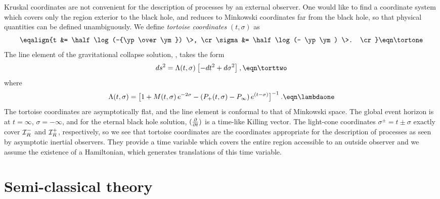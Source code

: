 Kruskal coordinates are not convenient for the description of
processes by an external observer.  One would like to find a
coordinate system which covers only the region exterior to the black
hole, and reduces to Minkowski coordinates far from the black hole,
so that physical quantities can be defined unambiguously.  We define
{\it tortoise coordinates\/} $(t,\sigma)$ as
$$
\eqalign{t &= \half \log (-{\yp\over \ym}) \>, \cr
\sigma &= \half \log (- \yp \ym) \>. \cr}
\eqn\tortone
$$
The line element of the gravitational collapse solution, \imone ,
takes the form
$$
ds^2 = \Lambda(t,\sigma)\> \bigl[ -dt^2 + d\sigma^2 \bigr] \>,
\eqn\torttwo
$$
where
$$
\Lambda(t,\sigma) =
\bigl[1+M(t,\sigma)\,e^{-2\sigma}
-(P_+(t,\sigma)-P_{\infty})\,e^{(t-\sigma)}
\bigr]^{-1}\>.
\eqn\lambdaone
$$
The tortoise coordinates are asymptotically flat, and the line
element is conformal to that of Minkowski space.  The global event
horizon is at $t = \infty$, $\sigma = - \infty$, and for the eternal
black hole solution, $({\partial\over \partial t})$ is a time-like Killing
vector.  The light-cone coordinates $\sigma^{\pm} = t \pm \sigma$
exactly cover ${\cal I}_R^-$ and ${\cal I}_R^+$, respectively, so we see that
tortoise coordinates are the coordinates appropriate for the
description of processes as seen by asymptotic inertial observers.
They provide a time variable which covers the entire region
accessible to an outside observer and we assume the existence of a
Hamiltonian, which generates translations of this time variable.

\section{Semi-classical theory}

